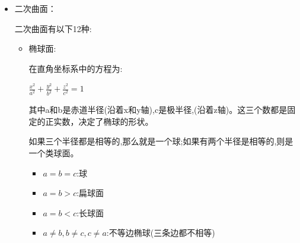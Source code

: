 \documentclass[UTF8]{ctexbook}
\newcommand{\defFunction}[1]{f(#1)}
\begin{document}
{{{{\begin{itemize}
{\begin{itemize}
{                      \begin{itemize}
                        \item 绕x轴旋转,曲面表达式为:$\defFunction{x,\pm\sqrt{y^2 + z^2}} = 0$
                        \item 绕y轴旋转,曲面表达式为:$\defFunction{\pm\sqrt{x^2 + z^2},y} = 0$
                      \end{itemize}
                      }
                \item {
                      设XOZ平面上有曲线$\defFunction{x,z} = 0$:

                      \begin{itemize}
                        \item 绕x轴旋转,曲面表达式为:$\defFunction{x,\pm\sqrt{y^2 + z^2}} = 0$
                        \item 绕z轴旋转,曲面表达式为:$\defFunction{\pm\sqrt{x^2 + y^2},z} = 0$
                      \end{itemize}
                      }
              \end{itemize}
              }
        \item {
              二次曲面：

              二次曲面有以下12种:
              \begin{itemize}
                \item {
                      椭球面:

                      在直角坐标系中的方程为:

                      $\frac{x^2}{a^2} + \frac{y^2}{b^2} + \frac{z^2}{c^2} = 1$

                      其中a和b是赤道半径(沿着x和y轴),c是极半径,(沿着z轴)。这三个数都是固定的正实数，决定了椭球的形状。

                      如果三个半径都是相等的,那么就是一个球;如果有两个半径是相等的,则是一个类球面。

                      \begin{itemize}
                        \item $a = b = c$:球
                        \item $a = b > c$:扁球面
                        \item $a = b < c$:长球面
                        \item $a \neq b,b \neq c,c \neq a$:不等边椭球(三条边都不相等)
                      \end{itemize}

}
\end{itemize}}
\end{itemize}}}}}
\end{document}

